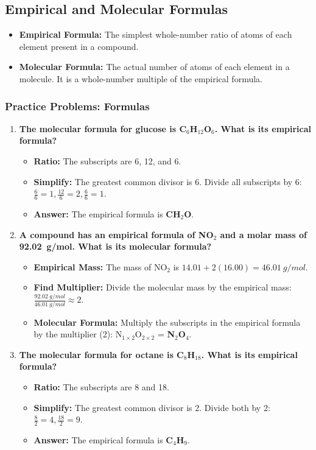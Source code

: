 \documentclass{article}
\begin{document}
\subsection*{Empirical and Molecular Formulas}
\begin{itemize}[itemsep=5pt]
    \item \textbf{Empirical Formula:} The simplest whole-number ratio of atoms of each element present in a compound.
    \item \textbf{Molecular Formula:} The actual number of atoms of each element in a molecule. It is a whole-number multiple of the empirical formula.
\end{itemize}

\subsubsection*{Practice Problems: Formulas}
\begin{enumerate}[itemsep=5pt]
    \item \textbf{The molecular formula for glucose is C\(_6\)H\(_{12}\)O\(_6\). What is its empirical formula?}
    \begin{itemize}
        \item \textbf{Ratio:} The subscripts are 6, 12, and 6.
        \item \textbf{Simplify:} The greatest common divisor is 6. Divide all subscripts by 6: \( \frac{6}{6}=1, \frac{12}{6}=2, \frac{6}{6}=1 \).
        \item \textbf{Answer:} The empirical formula is \textbf{CH\(_2\)O}.
    \end{itemize}
    \item \textbf{A compound has an empirical formula of NO\(_2\) and a molar mass of \SI{92.02}{g/mol}. What is its molecular formula?}
    \begin{itemize}
        \item \textbf{Empirical Mass:} The mass of NO\(_2\) is \(14.01 + 2(16.00) = \SI{46.01}{g/mol}\).
        \item \textbf{Find Multiplier:} Divide the molecular mass by the empirical mass: \( \frac{\SI{92.02}{g/mol}}{\SI{46.01}{g/mol}} \approx 2 \).
        \item \textbf{Molecular Formula:} Multiply the subscripts in the empirical formula by the multiplier (2): N\(_{1 \times 2}\)O\(_{2 \times 2}\) = \textbf{N\(_2\)O\(_4\)}.
    \end{itemize}
    \item \textbf{The molecular formula for octane is C\(_8\)H\(_{18}\). What is its empirical formula?}
     \begin{itemize}
        \item \textbf{Ratio:} The subscripts are 8 and 18.
        \item \textbf{Simplify:} The greatest common divisor is 2. Divide both by 2: \( \frac{8}{2}=4, \frac{18}{2}=9 \).
        \item \textbf{Answer:} The empirical formula is \textbf{C\(_4\)H\(_9\)}.
    \end{itemize}
\end{enumerate}
\end{document}
